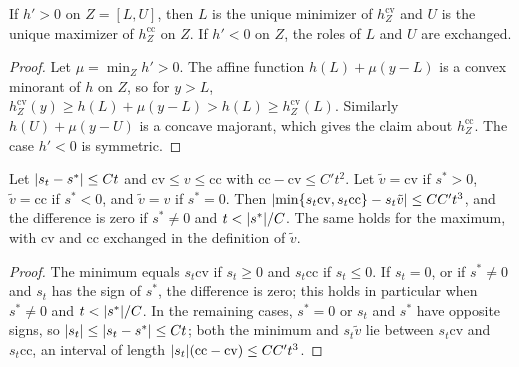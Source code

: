 \begin{lemma}\label{lem:monotone-argmin}
If $h'>0$ on $Z=[L,U]$, then $L$ is the unique minimizer of $h^{\mathrm{cv}}_Z$
and $U$ is the unique maximizer of $h^{\mathrm{cc}}_Z$ on $Z$. If $h'<0$ on
$Z$, the roles of $L$ and $U$ are exchanged.
\end{lemma}

\begin{proof}
Let $\mu=\min_Zh'>0$. The affine function $h(L)+\mu(y-L)$ is a convex
minorant of $h$ on $Z$, so for $y>L$,
$h^{\mathrm{cv}}_Z(y)\ge h(L)+\mu(y-L)>h(L)\ge h^{\mathrm{cv}}_Z(L)$. Similarly
$h(U)+\mu(y-U)$ is a concave majorant, which gives the claim about
$h^{\mathrm{cc}}_Z$. The case $h'<0$ is symmetric.
\end{proof}

\begin{lemma}\label{lem:sign-selection}
Let $\lvert s_t-s^*\rvert\le Ct$ and $\mathrm{cv}\le v\le\mathrm{cc}$ with
$\mathrm{cc}-\mathrm{cv}\le C't^2$. Let $\tilde v=\mathrm{cv}$ if $s^*>0$,
$\tilde v=\mathrm{cc}$ if $s^*<0$, and $\tilde v=v$ if $s^*=0$. Then
$\lvert \min\{s_t\mathrm{cv},s_t\mathrm{cc}\}-s_t\tilde v\rvert\le CC't^3$, and the
difference is zero if $s^*\ne0$ and $t<\lvert s^*\rvert/C$. The same holds for the
maximum, with $\mathrm{cv}$ and $\mathrm{cc}$ exchanged in the definition of
$\tilde v$.
\end{lemma}

\begin{proof}
The minimum equals $s_t\mathrm{cv}$ if $s_t\ge0$ and $s_t\mathrm{cc}$ if
$s_t\le0$. If $s_t=0$, or if $s^*\ne0$ and $s_t$ has the sign of $s^*$, the
difference is zero; this holds in particular when $s^*\ne0$ and
$t<\lvert s^*\rvert/C$. In the remaining cases, $s^*=0$ or $s_t$ and $s^*$ have
opposite signs, so $\lvert s_t\rvert\le\lvert s_t-s^*\rvert\le Ct$; both the minimum and
$s_t\tilde v$ lie between $s_t\mathrm{cv}$ and $s_t\mathrm{cc}$, an interval of
length $\lvert s_t\rvert(\mathrm{cc}-\mathrm{cv})\le CC't^3$.
\end{proof}

